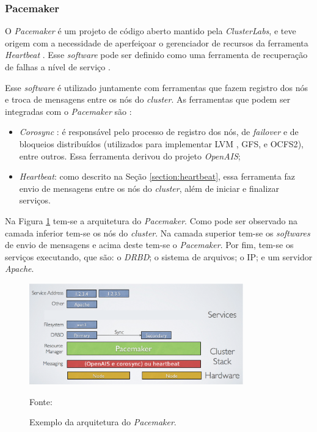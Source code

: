 

\subsubsection{Pacemaker}
\label{section:pacemaker}
O \textit{Pacemaker} \cite{pacemaker} é um projeto de código aberto mantido pela \textit{ClusterLabs}, e teve origem com a necessidade de 
aperfeiçoar o gerenciador de recursos da ferramenta \textit{Heartbeat} \cite{heartbeat}. 
Esse \textit{software} pode ser definido como uma ferramenta de recuperação de falhas a nível de serviço \cite{perkov2011}. 

Esse \textit{software} é utilizado juntamente com ferramentas que fazem registro dos nós e troca de mensagens entre os nós do \textit{cluster}.
As ferramentas que podem ser integradas com o \textit{Pacemaker} são \cite{pacemaker}:
\begin{itemize}
 \item \textit{Corosync} \cite{corosync}: é responsável pelo processo de registro dos nós, de \textit{failover} e de bloqueios distribuídos 
 (utilizados para implementar \ac{LVM} \cite{lvm}, \ac{GFS}, e \ac{OCFS2}), entre outros. Essa ferramenta derivou do projeto \textit{OpenAIS};
 \item \textit{Heartbeat}: como descrito na Seção \ref{section:heartbeat}, essa ferramenta faz envio de mensagens entre os nós do \textit{cluster},
 além de iniciar e finalizar serviços.
\end{itemize}


Na Figura \ref{fig:pacemaker_tools} tem-se a arquitetura do \textit{Pacemaker}. Como pode ser observado na camada inferior tem-se os nós do 
\textit{cluster}. Na camada superior tem-se os \textit{softwares} de envio de mensagens e acima deste tem-se o \textit{Pacemaker}. 
Por fim, tem-se os serviços executando, que são: o \textit{DRBD}; o sistema de arquivos; o \ac{IP}; e um servidor \textit{Apache}.

\begin{figure}[h!]
 \centering
 \includegraphics[width=350px]{img/pacemaker_tools.eps}
 \caption{Exemplo da arquitetura do \textit{Pacemaker}.}
 Fonte: \citet{pacemaker}
 \label{fig:pacemaker_tools}
\end{figure}

